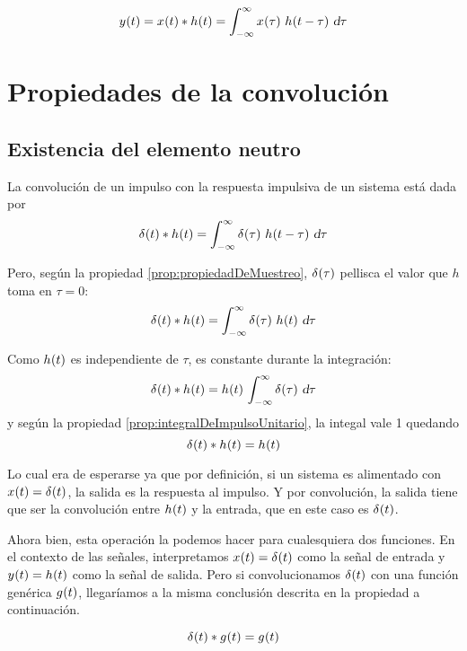 \begin{mdframed}[style=DefinitionFrame]
    \begin{defn}
    \end{defn}
    \[
        \fx[y]{t}
        = \fx[x]{t} * \fx[h]{t}
        = \convol{x}
    \]
\end{mdframed}

\section{Propiedades de la convolución}

\subsection{Existencia del elemento neutro}

La convolución de un impulso con la respuesta impulsiva de un sistema está dada por
\[
    \fx[\delta]{t} * \fx[h]{t} = \convol{\delta}
\]

Pero, según la propiedad \ref{prop:propiedadDeMuestreo}, $\fx[\delta]{\tau}$ pellisca el valor que $h$ toma en $\tau = 0$:
\[
    \fx[\delta]{t} * \fx[h]{t}
    = \int_{-\infty}^\infty \fx[\delta]{\tau} \, \fx[h]{t} \, \dif \tau
\]

Como $\fx[h]{t}$ es independiente de $\tau$, es constante durante la integración:
\[
    \fx[\delta]{t} * \fx[h]{t}
    = \fx[h]{t} \, \int_{-\infty}^\infty \fx[\delta]{\tau} \, \dif \tau
\]
y según la propiedad \ref{prop:integralDeImpulsoUnitario}, la integal vale 1 quedando
\[
    \fx[\delta]{t} * \fx[h]{t} = \fx[h]{t}
\]

Lo cual era de esperarse ya que por definición, si un sistema es alimentado con $\fx[x]{t} = \fx[\delta]{t}$, la salida es la respuesta al impulso.
Y por convolución, la salida tiene que ser la convolución entre $\fx[h]{t}$ y la entrada, que en este caso es $\fx[\delta]{t}$.

Ahora bien, esta operación la podemos hacer para cualesquiera dos funciones.
En el contexto de las señales, interpretamos $\fx[x]{t} = \fx[\delta]{t}$ como la señal de entrada y $\fx[y]{t} = \fx[h]{t}$ como la señal de salida.
Pero si convolucionamos $\fx[\delta]{t}$ con una función genérica $\fx[g]{t}$, llegaríamos a la misma conclusión descrita en la propiedad a continuación.

\begin{mdframed}[style=PropertyFrame]
    \begin{prop}
    \end{prop}
    \[
        \fx[\delta]{t} * \fx[g]{t} = \fx[g]{t}
    \]
\end{mdframed}


